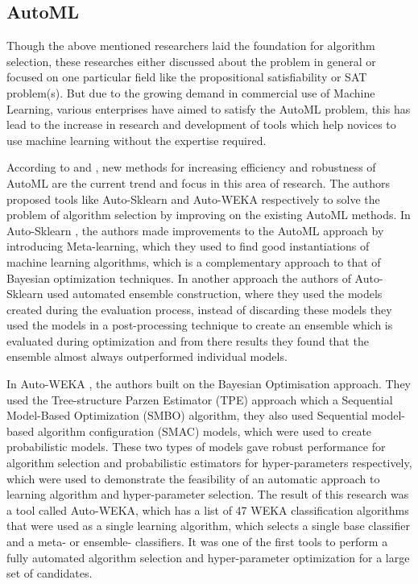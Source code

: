 \subsection*{AutoML}

Though the above mentioned researchers laid the foundation for algorithm selection, these researches either discussed about the problem in general or focused on one particular field like the propositional satisfiability or SAT problem(s). But due to the growing demand in commercial use of Machine Learning, various enterprises have aimed to satisfy the AutoML problem, this has lead to the increase in research and development of tools which help novices to use machine learning without the expertise required.

According to \citep{feurer:m} and \citep{kotthoff:l}, new methods for increasing efficiency and robustness of AutoML are the current trend and focus in this area of research. The authors proposed tools like Auto-Sklearn and Auto-WEKA respectively to solve the problem of algorithm selection by improving on the existing AutoML methods. In Auto-Sklearn \citep{feurer:m}, the authors made improvements to the AutoML approach by introducing Meta-learning, which they used to find good instantiations of machine learning algorithms, which is a complementary approach to that of Bayesian optimization techniques. In another approach the authors of Auto-Sklearn used automated ensemble construction, where they used the models created during the evaluation process, instead of discarding these models they used the models in a post-processing technique to create an ensemble which is evaluated during optimization and from there results they found that the ensemble almost always outperformed individual models. 

In Auto-WEKA \citep{kotthoff:l}, the authors built on the Bayesian Optimisation approach. They used the Tree-structure Parzen Estimator (TPE) approach which a Sequential Model-Based Optimization (SMBO) algorithm, they also used Sequential model-based algorithm configuration (SMAC) models, which were used to create probabilistic models. These two types of models gave robust performance for algorithm selection and probabilistic estimators for hyper-parameters respectively, which were used to demonstrate the feasibility of an automatic approach to learning algorithm and hyper-parameter selection. The result of this research was a tool called Auto-WEKA, which has a list of 47 WEKA classification algorithms that were used as a single learning algorithm, which selects a single base classifier and a meta- or ensemble- classifiers. It was one of the first tools to perform a fully automated algorithm selection and hyper-parameter optimization for a large set of candidates.

